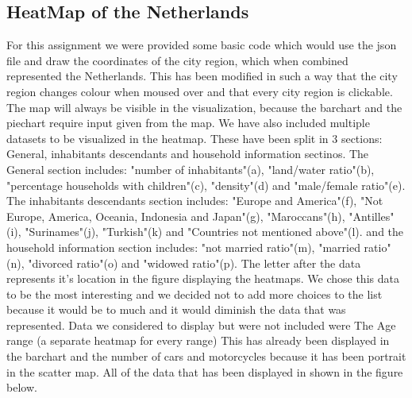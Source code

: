\documentclass[a4paper,twoside,11pt]{article}
\begin{document}
\subsection{HeatMap of the Netherlands}
For this assignment we were provided some basic code which would use the json file and draw the coordinates of the city region, which when combined represented the Netherlands. This has been modified in such a way that the city region changes colour when moused over and that every city region is clickable. The map will always be visible in the visualization, because the barchart and the piechart require input given from the map. \newline
We have also included multiple datasets to be visualized in the heatmap. These have been split in 3 sections: General, inhabitants descendants and household information sectinos. \newline
The General section includes: "number of inhabitants"(a), "land/water ratio"(b), "percentage households with children"(c), "density"(d) and "male/female ratio"(e). \newline
The inhabitants descendants section includes: "Europe and America"(f), "Not Europe, America, Oceania, Indonesia and Japan"(g), "Maroccans"(h), "Antilles"(i), "Surinames"(j), "Turkish"(k) and "Countries not mentioned above"(l). \newline
and the household information section includes: "not married ratio"(m), "married ratio"(n), "divorced ratio"(o) and "widowed ratio"(p). The letter after the data represents it's location in the figure displaying the heatmaps. \newline
We chose this data to be the most interesting and we decided not to add more choices to the list because it would be to much and it would diminish the data that was represented. Data we considered to display but were not included were The Age range (a separate heatmap for every range) This has already been displayed in the barchart and the number of cars and motorcycles because it has been portrait in the scatter map. \newline
All of the data that has been displayed in shown in the figure below. \newline
\end{document}
